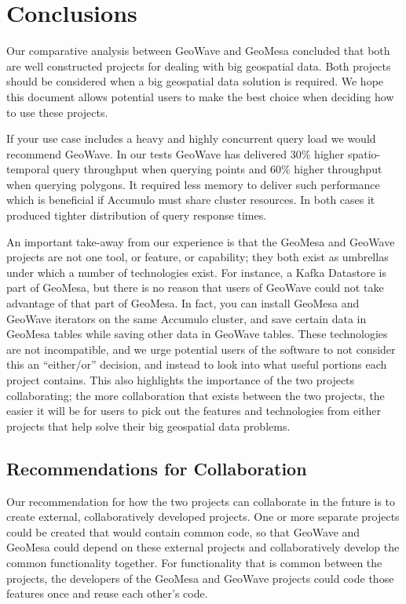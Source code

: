 \section{Conclusions}
\label{sec:conclusions}

Our comparative analysis between GeoWave and GeoMesa concluded that both are well constructed projects for dealing with big geospatial data.
Both projects should be considered when a big geospatial data solution is required.
We hope this document allows potential users to make the best choice when deciding how to use these projects.

If your use case includes a heavy and highly concurrent query load we would recommend GeoWave.
In our tests GeoWave has delivered $30$\% higher spatio-temporal query throughput when querying points and $60$\% higher throughput when querying polygons.
It required less memory to deliver such performance which is beneficial if Accumulo must share cluster resources.
In both cases it produced tighter distribution of query response times.

An important take-away from our experience is that the GeoMesa and GeoWave projects are not one tool, or feature, or capability; they both exist as umbrellas under which a number of technologies exist.
For instance, a Kafka Datastore is part of GeoMesa, but there is no reason that users of GeoWave could not take advantage of that part of GeoMesa.
In fact, you can install GeoMesa and GeoWave iterators on the same Accumulo cluster, and save certain data in GeoMesa tables while saving other data in GeoWave tables.
These technologies are not incompatible, and we urge potential users of the software to not consider this an ``either/or'' decision, and instead to look into what useful portions each project contains.
This also highlights the importance of the two projects collaborating; the more collaboration that exists between the two projects, the easier it will be for users to pick out the features and technologies from either projects that help solve their big geospatial data problems.


\subsection{Recommendations for Collaboration}
\label{sec:conclusions:collaboration}

Our recommendation for how the two projects can collaborate in the future is to create external, collaboratively developed projects.
One or more separate projects could be created that would contain common code, so that GeoWave and GeoMesa could depend on these external projects and collaboratively develop the common functionality together.
For functionality that is common between the projects, the developers of the GeoMesa and GeoWave projects could code those features once and reuse each other's code.

